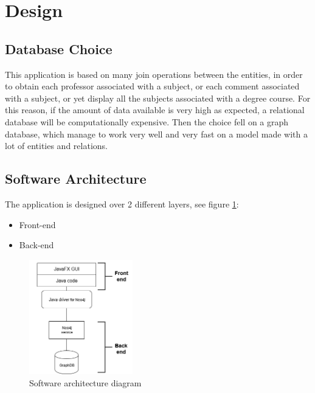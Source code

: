 \documentclass[a4paper]{article}
\begin{document}
\clearpage
\section{Design}

\subsection{Database Choice}
This application is based on many join operations between the entities, in order to obtain each professor associated with a subject, or each comment associated with a subject, or yet display all the subjects associated with a degree course. For this reason, if the amount of data available is very high as expected, a relational database will be computationally expensive. Then the choice fell on a graph database, which manage to work very well and very fast on a model made with a lot of entities and relations.\\

\subsection{Software Architecture}
The application is designed over 2 different layers, see figure \ref{fig:architecture_diagram}:
\begin{itemize}
\item Front-end
\item Back-end
\end{itemize}
\begin{figure}[h]
\centering
\includegraphics[width=0.4\textwidth]{./images/diagrams/architecture_diagram.png} 
\caption{Software architecture diagram\\}
\label{fig:architecture_diagram}
\end{figure}

\end{document}
